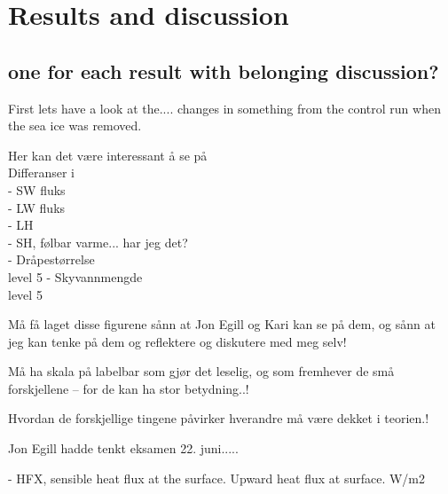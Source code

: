 \chapter{Results and discussion}
\label{chap:results}
\section{one for each result with belonging discussion?}
First lets have a look at the.... changes in something from the control run when the sea ice was removed.


Her kan det være interessant å se på\\
Differanser i\\
- SW fluks\\
- LW fluks\\
- LH \\
- SH, følbar varme... har jeg det?\\
- Dråpestørrelse\\ level 5
- Skyvannmengde\\ level 5

Må få laget disse figurene sånn at Jon Egill og Kari kan se på dem, og sånn at jeg kan tenke på dem og reflektere og diskutere med meg selv!

Må ha skala på labelbar som gjør det leselig, og som fremhever de små forskjellene -- for de kan ha stor betydning..!

Hvordan de forskjellige tingene påvirker hverandre må være dekket i teorien.!

Jon Egill hadde tenkt eksamen 22. juni.....

- HFX, sensible heat flux at the surface. Upward heat flux at surface. W/m2